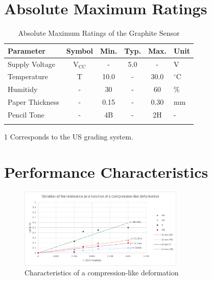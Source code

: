 \documentclass[10pt]{datasheet}
\begin{document}
\section{Absolute Maximum Ratings}

\begin{table}[h!]
\begin{threeparttable}
\caption{Absolute Maximum Ratings of the Graphite Sensor}
\begin{tabularx}{\textwidth}{l | c | c c c | X}
    \thickhline
    \textbf{Parameter} & \textbf{Symbol} & \textbf{Min.} & \textbf{Typ.} & \textbf{Max.} & \textbf{Unit} \\
    \hline
    Supply Voltage & V$_{\text{CC}}$ & - & 5.0 & - & V \\
    \hline
    Temperature & T & 10.0 & - & 30.0 & $^\circ$C \\
    Humitidy & - & 30 & - & 60 & \% \\
    \hline
    Paper Thickness & - & 0.15 & - & 0.30 & mm \\
    Pencil Tone\tnote{1} & - & 4B & - & 2H & - \\
    \thickhline
\end{tabularx}
\begin{tablenotes}
\item[1]{Corresponds to the US grading system.}
\end{tablenotes}
\end{threeparttable}
\end{table}

\newpage

\section{Performance Characteristics}

\begin{figure}[h!]
	\centering
	\includegraphics[width=0.7\textwidth]{Cover/Bench-Compression.png}
    \captionsetup{justification=centering}
	\caption{\small{Characteristics of a compression-like deformation}}
\end{figure}
\end{document}
